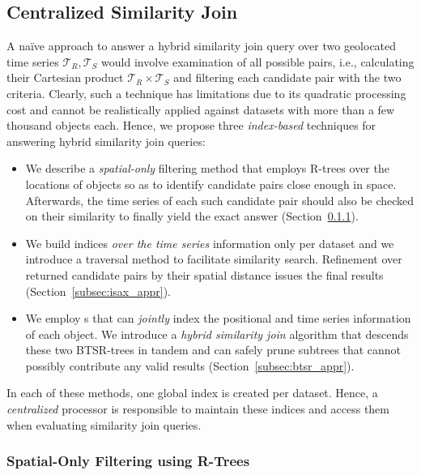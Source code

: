 \subsection{Centralized Similarity Join}
\label{sec:centralized}

A na\"ive approach to answer a hybrid similarity join query over two geolocated time series $\mathcal{T}_{R}, \mathcal{T}_{S}$ would involve examination of all possible pairs, i.e., calculating their Cartesian product $\mathcal{T}_{R} \times \mathcal{T}_{S}$ and filtering each candidate pair with the two criteria. Clearly, such a technique has limitations due to its quadratic processing cost and cannot be realistically applied against datasets with more than a few thousand objects each.  
Hence, we propose three {\em index-based} techniques for answering hybrid similarity join queries:

\begin{itemize}
\item We describe a {\em spatial-only} filtering method that employs R-trees over the locations of objects so as to identify candidate pairs close enough in space. Afterwards, the time series of each such candidate pair should also be checked on their similarity to finally yield the exact answer (Section~\ref{subsec:rtree}). 
\item We build \isax indices {\em over the time series} information only per dataset and we introduce a traversal method to facilitate similarity search. Refinement over returned candidate pairs by their spatial distance issues the final results (Section~\ref{subsec:isax_appr}).
\item We employ {\btsr}s that can {\em jointly} index the positional and time series information of each object.  We introduce a {\em hybrid similarity join} algorithm that descends these two BTSR-trees in tandem and can safely prune subtrees that cannot possibly contribute any valid results (Section~\ref{subsec:btsr_appr}).
\end{itemize}

In each of these methods, one global index is created per dataset. Hence, a {\em centralized} processor is responsible to maintain these indices and access them when evaluating similarity join queries.


\subsubsection{Spatial-Only Filtering using R-Trees}
\label{subsec:rtree}

